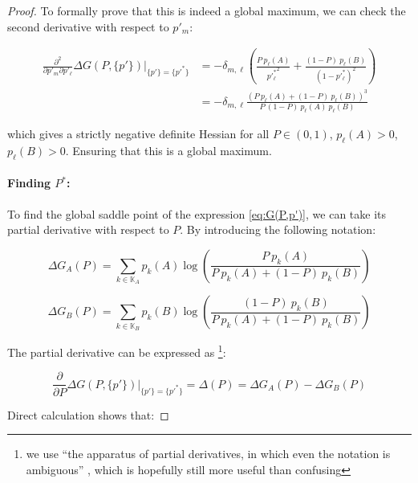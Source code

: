 \documentclass{article}
\theoremstyle{definition}
\begin{document}
\begin{proof}
To formally prove that this is indeed a global maximum, we can check the second derivative with respect to $p'_m$:

\begin{equation}
    \begin{split}
    \frac{\partial^2 }{\partial p'_m \partial p'_\ell} \Delta G(P, \{p'\}) \Bigr|_{\{p'\}=\{p'^*\}} &=
    - \delta_{m,\ell} \left ( \frac{P \ p_\ell(A)}{{p'^*_\ell}^2} +
    \frac{(1-P) \ p_\ell(B)}{(1-p'^*_\ell)^2}
    \right ) \\
    &= -  \delta_{m,\ell} \frac{(P \ p_\ell(A)+(1-P) \  p_\ell(B))^3}{P \ (1-P) \ p_\ell(A) \ p_\ell(B)}
    \end{split}
\end{equation}

which gives a strictly negative definite Hessian for all $P \in (0,1)$, $p_\ell(A)>0$, $p_\ell(B)>0$. Ensuring that this is a global maximum.

\paragraph{Finding $P^*$:}

To find the global saddle point of the expression \eqref{eq:G(P,p')}, we can take its partial derivative with respect to $P$.
By introducing the following notation:

\begin{equation}
    \label{eq:Appendix_GA(P)}
    \Delta G_A(P) = \sum_{k \in \mathbb{K}_A} p_k(A) \log \left ( \frac{P \ p_k(A)}{P \ p_k(A)+(1-P) \ p_k(B)} \right )
\end{equation}

\begin{equation}
    \label{eq:Appendix_GB(P)}
    \Delta G_B(P) = \sum_{k \in \mathbb{K}_B} p_k(B) \log \left ( \frac{(1-P) \ p_k(B)}{P \ p_k(A)+(1-P) \ p_k(B)} \right )
\end{equation}

The partial derivative can be expressed as \footnote{we use ``the apparatus of partial derivatives, in which even the notation is ambiguous'' \cite{book:Arnold}, which is hopefully still more useful than confusing}:

\begin{equation}
    \frac{\partial}{\partial P} \Delta G(P, \{p'\}) \Bigr|_{\{p'\}=\{p'^*\}} = \Delta(P) = \Delta G_A(P) - \Delta G_B(P)
\end{equation}

Direct calculation shows that:


\end{proof}
\end{document}
